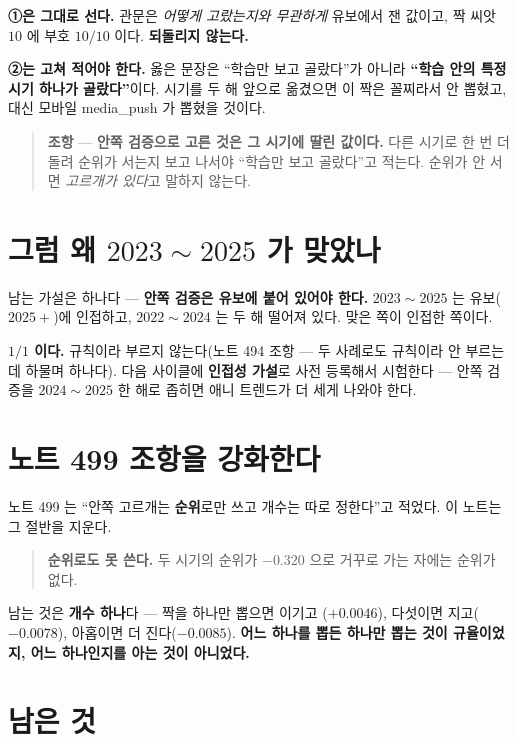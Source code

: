 \documentclass[11pt]{article}
\begin{document}
\textbf{①은 그대로 선다.} 관문은 \emph{어떻게 고랐는지와 무관하게}
유보에서 잰 값이고, 짝 씨앗 $10$ 에 부호 $10/10$ 이다. \textbf{되돌리지
않는다.}

\textbf{②는 고쳐 적어야 한다.} 옳은 문장은 ``학습만 보고 골랐다''가
아니라 \textbf{``학습 안의 특정 시기 하나가 골랐다''}이다. 시기를 두 해
앞으로 옮겼으면 이 짝은 꼴찌라서 안 뽑혔고, 대신 모바일 media\_push 가
뽑혔을 것이다.

\begin{quote}
\textbf{조항} --- \textbf{안쪽 검증으로 고른 것은 그 시기에 딸린 값이다.}
다른 시기로 한 번 더 돌려 순위가 서는지 보고 나서야 ``학습만 보고
골랐다''고 적는다. 순위가 안 서면 \emph{고르개가 있다}고 말하지 않는다.
\end{quote}

\section{그럼 왜 $2023\!\sim\!2025$ 가 맞았나}

남는 가설은 하나다 --- \textbf{안쪽 검증은 유보에 붙어 있어야 한다.}
$2023\!\sim\!2025$ 는 유보($2025+$)에 인접하고, $2022\!\sim\!2024$ 는
두 해 떨어져 있다. 맞은 쪽이 인접한 쪽이다.

\textbf{$1/1$ 이다.} 규칙이라 부르지 않는다(노트 494 조항 --- 두 사례로도
규칙이라 안 부르는데 하물며 하나다). 다음 사이클에 \textbf{인접성
가설}로 사전 등록해서 시험한다 --- 안쪽 검증을 $2024\!\sim\!2025$ 한 해로
좁히면 애니 트렌드가 더 세게 나와야 한다.

\section{노트 499 조항을 강화한다}

노트 499 는 ``안쪽 고르개는 \textbf{순위}로만 쓰고 개수는 따로 정한다''고
적었다. 이 노트는 그 절반을 지운다.

\begin{quote}
\textbf{순위로도 못 쓴다.} 두 시기의 순위가 $-0.320$ 으로 거꾸로 가는
자에는 순위가 없다.
\end{quote}

남는 것은 \textbf{개수 하나}다 --- 짝을 하나만 뽑으면 이기고
($+0.0046$), 다섯이면 지고($-0.0078$), 아홉이면 더 진다($-0.0085$).
\textbf{어느 하나를 뽑든 하나만 뽑는 것이 규율이었지, 어느 하나인지를
아는 것이 아니었다.}

\section*{남은 것}
\end{document}
